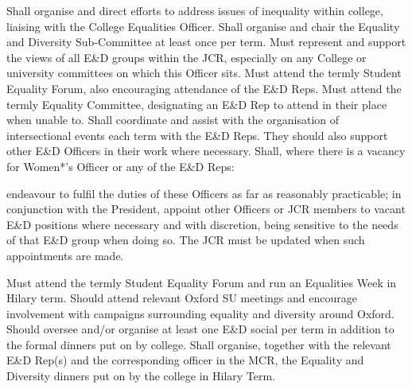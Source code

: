 Shall organise and direct efforts to address issues of inequality within college, liaising with the College Equalities Officer.
Shall organise and chair the Equality and Diversity Sub-Committee at least once per term. 
Must represent and support the views of all E\&D groups within the JCR, especially on any College or university committees on which this Officer sits.
Must attend the termly Student Equality Forum, also encouraging attendance of the E\&D Reps.
Must attend the termly Equality Committee, designating an E\&D Rep to attend in their place when unable to. 
Shall coordinate and assist with the organisation of intersectional events each term with the E\&D Reps. They should also support other E\&D Officers in their work where necessary.
Shall, where there is a vacancy for Women*'s Officer or any of the E\&D Reps:\begin{enumerate}
endeavour to fulfil the duties of these Officers as far as reasonably practicable;
in conjunction with the President, appoint other Officers or JCR members to vacant E\&D positions where necessary and with discretion, being sensitive to the needs of that E\&D group when doing so. The JCR must be updated when such appointments are made.\end{enumerate}
Must attend the termly Student Equality Forum and run an Equalities Week in Hilary term.
Should attend relevant Oxford SU meetings and encourage involvement with campaigns surrounding equality and diversity around Oxford.
Should oversee and/or organise at least one E\&D social per term in addition to the formal dinners put on by college. 
Shall organise, together with the relevant E\&D Rep(s) and the corresponding officer in the MCR, the Equality and Diversity dinners put on by the college in Hilary Term.
